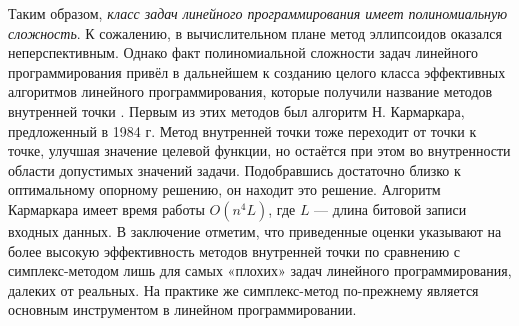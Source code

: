 Таким образом, \textit{класс задач линейного программирования имеет полиномиальную сложность}. К сожалению, в вычислительном плане метод эллипсоидов оказался неперспективным. Однако факт полиномиальной сложности задач линейного программирования привёл в дальнейшем к созданию целого класса эффективных алгоритмов линейного программирования, которые получили название методов внутренней точки \cite{literature_dikin}.
Первым из этих методов был алгоритм Н. Кармаркара, предложенный в 1984 г. Метод внутренней точки тоже переходит от точки к точке, улучшая значение целевой функции, но остаётся при этом во внутренности области допустимых значений задачи. Подобравшись достаточно близко к оптимальному опорному решению, он находит это решение. Алгоритм Кармаркара имеет время работы $O(n^4L)$, где $L$ — длина битовой записи входных данных.
В заключение отметим, что приведенные оценки указывают на более высокую эффективность методов внутренней точки по сравнению с симплекс-методом лишь для самых «плохих» задач линейного программирования, далеких от реальных. На практике же симплекс-метод по-прежнему является основным инструментом в линейном программировании.

